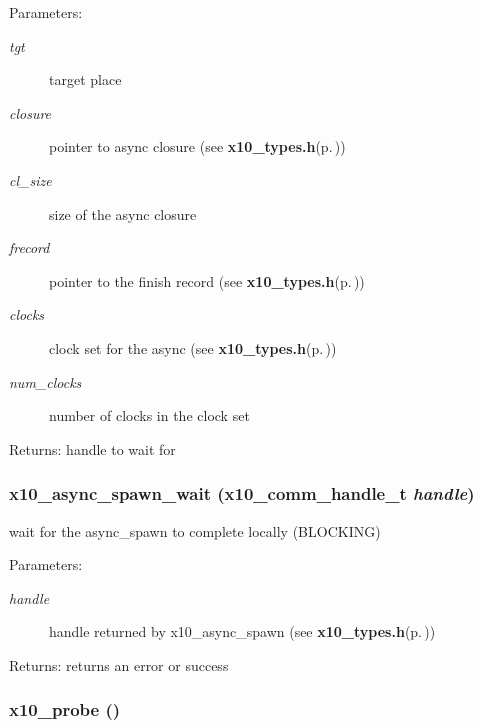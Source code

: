 \begin{Desc}
\item[Parameters:]
\begin{description}
\item[{\em tgt}]target place \item[{\em closure}]pointer to async closure (see {\bf x10\_\-types.h}{\rm (p.\,\pageref{x10__types_8h})}) \item[{\em cl\_\-size}]size of the async closure \item[{\em frecord}]pointer to the finish record (see {\bf x10\_\-types.h}{\rm (p.\,\pageref{x10__types_8h})}) \item[{\em clocks}]clock set for the async (see {\bf x10\_\-types.h}{\rm (p.\,\pageref{x10__types_8h})}) \item[{\em num\_\-clocks}]number of clocks in the clock set\end{description}
\end{Desc}
\begin{Desc}
\item[Returns:]handle to wait for \end{Desc}
\subsubsection{ x10\_\-async\_\-spawn\_\-wait ({\bf x10\_\-comm\_\-handle\_\-t} {\em handle})}\label{async_8cc_a18}


wait for the async\_\-spawn to complete locally (BLOCKING) 

\begin{Desc}
\item[Parameters:]
\begin{description}
\item[{\em handle}]handle returned by x10\_\-async\_\-spawn (see {\bf x10\_\-types.h}{\rm (p.\,\pageref{x10__types_8h})})\end{description}
\end{Desc}
\begin{Desc}
\item[Returns:]returns an error or success \end{Desc}
\subsubsection{ x10\_\-probe ()}\label{async_8cc_a19}


